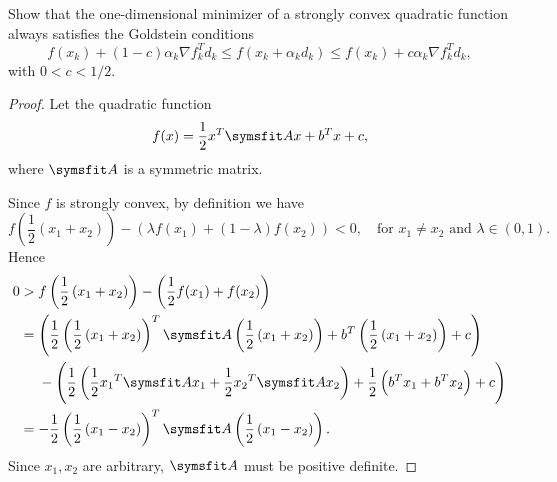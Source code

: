 \documentclass{assignment}[2019/09/15]
\newcommand{\dfd}{\nabla f_k^Td_k}
\newcommand{\ak}{\alpha_k}
\newcommand{\lxpx}{\frac{1}{2}\left(x_1+x_2\right)}
\newcommand{\blxpx}{\left(\lxpx\right)}
\newcommand{\lxmx}{\frac{1}{2}\left(x_1-x_2\right)}
\newcommand{\blxmx}{\left(\lxmx\right)}
\begin{document}
    \begin{problem}
        Show that the one-dimensional minimizer of a strongly convex quadratic function always satisfies the Goldstein conditions
        \begin{equation}
            f(x_k)+(1-c)\ak\dfd\leq f(x_k+\ak d_k)\leq f(x_k)+c\ak\dfd,
        \end{equation}
        with $0<c<1/2$.
    \end{problem}
    \begin{proof}
        Let the quadratic function
        \begin{equation}
            f(x)=\frac{1}{2}x^T\matr{A}x+b^Tx+c,
        \end{equation}
        where $\matr{A}$ is a symmetric matrix.

        Since $f$ is strongly convex, by definition we have
        \begin{equation}
            f\blxpx-\left(\lambda f(x_1)+(1-\lambda)f(x_2)\right)<0,\quad\text{for }x_1\neq x_2\text{ and } \lambda\in(0,1).
        \end{equation}
        Hence
        \begin{equation}
            \begin{aligned}
                0
                &>f\blxpx-\left(\frac{1}{2} f(x_1)+f(x_2)\right)\\
                &=\left(\frac{1}{2}\blxpx^T\matr{A}\blxpx+b^T\blxpx+c\right)\\
                &\phantom{{}={}}-\left(\frac{1}{2}\left(\frac{1}{2} {x_1}^T\matr{A}x_1+\frac{1}{2}{x_2}^T\matr{A}x_2\right)+\frac{1}{2}\left(b^Tx_1+b^Tx_2\right)+c\right)\\
                &= -\frac{1}{2}\blxmx^T\matr{A}\blxmx.
            \end{aligned}
        \end{equation}
        Since $x_1, x_2$ are arbitrary, $\matr{A}$ must be positive definite.


\end{proof}
\end{document}
